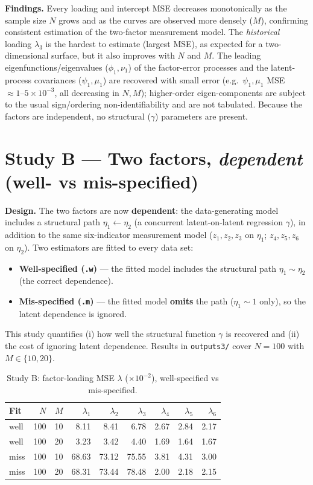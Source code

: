 \documentclass[11pt]{article}
\begin{document}
\textbf{Findings.} Every loading and intercept MSE decreases monotonically as the
sample size $N$ grows and as the curves are observed more densely ($M$),
confirming consistent estimation of the two-factor measurement model. The
\emph{historical} loading $\lambda_3$ is the hardest to estimate (largest MSE), as
expected for a two-dimensional surface, but it also improves with $N$ and $M$. The
leading eigenfunctions/eigenvalues ($\phi_1,\nu_1$) of the factor-error processes
and the latent-process covariances ($\psi_1,\mu_1$) are recovered with small error
(e.g.\ $\psi_1,\mu_1$ MSE $\approx 1\text{--}5\times10^{-3}$, all decreasing in
$N,M$); higher-order eigen-components are subject to the usual sign/ordering
non-identifiability and are not tabulated. Because the factors are independent, no
structural ($\gamma$) parameters are present.

\section*{Study B --- Two factors, \emph{dependent} (well- vs mis-specified)}

\textbf{Design.} The two factors are now \textbf{dependent}: the data-generating
model includes a structural path $\eta_1 \leftarrow \eta_2$ (a concurrent
latent-on-latent regression $\gamma$), in addition to the same six-indicator
measurement model ($z_1,z_2,z_3$ on $\eta_1$; $z_4,z_5,z_6$ on $\eta_2$). Two
estimators are fitted to every data set:
\begin{itemize}
  \item \textbf{Well-specified (\texttt{.w})} --- the fitted model includes the
  structural path $\eta_1 \sim \eta_2$ (the correct dependence).
  \item \textbf{Mis-specified (\texttt{.m})} --- the fitted model \textbf{omits}
  the path ($\eta_1 \sim 1$ only), so the latent dependence is ignored.
\end{itemize}
This study quantifies (i) how well the structural function $\gamma$ is recovered
and (ii) the cost of ignoring latent dependence. Results in \texttt{outputs3/}
cover $N=100$ with $M\in\{10,20\}$.

\begin{table}[ht]
\centering
\caption{Study B: factor-loading MSE $\lambda$ ($\times 10^{-2}$), well-specified vs mis-specified.}
\begin{tabular}{lrrrrrrrr}
\toprule
Fit & $N$ & $M$ & $\lambda_1$ & $\lambda_2$ & $\lambda_3$ & $\lambda_4$ & $\lambda_5$ & $\lambda_6$ \\
\midrule
well & 100 & 10 &  8.11 &  8.41 &  6.78 & 2.67 & 2.84 & 2.17 \\
well & 100 & 20 &  3.23 &  3.42 &  4.40 & 1.69 & 1.64 & 1.67 \\
miss & 100 & 10 & 68.63 & 73.12 & 75.55 & 3.81 & 4.31 & 3.00 \\
miss & 100 & 20 & 68.31 & 73.44 & 78.48 & 2.00 & 2.18 & 2.15 \\
\bottomrule
\end{tabular}
\end{table}
\end{document}

